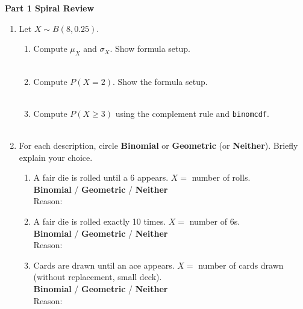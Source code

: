 \documentclass[10pt]{article}
\begin{document}
\namedateperiod

\vspace{0.3in}

{\large\bfseries\color{navy} Part 1 \quad Spiral Review}

\vspace{0.12in}

\begin{enumerate}

    \item Let $X \sim B(8, 0.25)$.
    \begin{enumerate}[label=(\alph*), itemsep=8pt]
        \item Compute $\mu_X$ and $\sigma_X$. Show formula setup.\\
        \writeline\\[1pt]\writeline
        \item Compute $P(X = 2)$. Show the formula setup.\\
        \writeline\\[1pt]\writeline
        \item Compute $P(X \ge 3)$ using the complement rule and \texttt{binomcdf}.\\
        \writeline\\[1pt]\writeline
    \end{enumerate}

    \vspace{0.18in}

    \item For each description, circle \textbf{Binomial} or \textbf{Geometric} (or
    \textbf{Neither}). Briefly explain your choice.
    \begin{enumerate}[label=(\alph*), itemsep=10pt]
        \item A fair die is rolled until a 6 appears. $X =$ number of rolls.\\
              \textbf{Binomial} \quad / \quad \textbf{Geometric} \quad / \quad \textbf{Neither}\\
              Reason: \writeline
        \item A fair die is rolled exactly 10 times. $X =$ number of 6s.\\
              \textbf{Binomial} \quad / \quad \textbf{Geometric} \quad / \quad \textbf{Neither}\\
              Reason: \writeline
        \item Cards are drawn until an ace appears. $X =$ number of cards drawn
              (without replacement, small deck).\\
              \textbf{Binomial} \quad / \quad \textbf{Geometric} \quad / \quad \textbf{Neither}\\
              Reason: \writeline
    \end{enumerate}


\end{enumerate}
\end{document}
